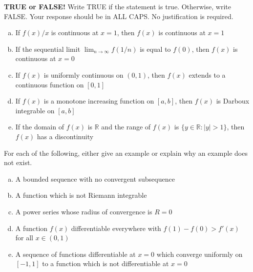\documentclass[11pt]{exam}
\theoremstyle{definition}
\begin{document}
\begin{questions}

\addpoints

\question[10]\mbox{}
\textbf{TRUE or FALSE!}  Write  TRUE if the statement is true.  Otherwise, write FALSE.  Your response should be in ALL CAPS.  No justification is required.
\begin{enumerate}[(a)]
\item  
If $f(x)/x$ is continuous at $x=1$, then $f(x)$ is continuous at $x=1$
\vspace{1.3in}
\item
If the sequential limit $\lim_{n\rightarrow\infty} f(1/n)$ is equal to $f(0)$, then $f(x)$ is continuous at $x=0$
\vspace{1.3in}
\item
If $f(x)$ is uniformly continuous on $(0,1)$, then $f(x)$ extends to a continuous function on $[0,1]$
\vspace{1.3in}
\item
If $f(x)$ is a monotone increasing function on $[a,b]$, then $f(x)$ is Darboux integrable on $[a,b]$
\vspace{1.3in}
\item  If the domain of $f(x)$ is $\mathbb{R}$ and the range of $f(x)$ is $\{y\in\mathbb{R}: \lvert y\rvert > 1\}$, then $f(x)$ has a discontinuity
\vspace{1.3in}
\end{enumerate}

\newpage
\question[10]\mbox{}

For each of the following, either give an example or explain why an example does not exist.

\begin{enumerate}[(a)]
\item  
A bounded sequence with no convergent subsequence
\vspace{1.3in}
\item
A function which is not Riemann integrable
\vspace{1.3in}
\item
A power series whose radius of convergence is $R=0$
\vspace{1.3in}
\item
A function $f(x)$ differentiable everywhere with $f(1)-f(0) > f'(x)$ for all $x\in (0,1)$
\vspace{1.3in}
\item
A sequence of functions differentiable at $x=0$ which converge uniformly on $[-1,1]$ to a function which is not differentiable at $x=0$
\vspace{1.3in}
\end{enumerate}


\end{questions}
\end{document}
